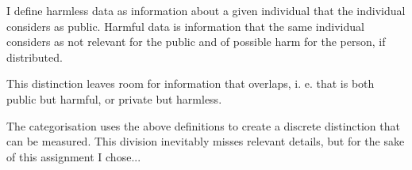 \documentclass{article}
\begin{document}
I define harmless data as information about a given individual that the 
individual considers as public.
Harmful data is information that the same individual considers as not 
relevant for the public and of possible harm for the person, if distributed.

This distinction leaves room for information that overlaps, i. e. that is
both public but harmful, or private but harmless.

The categorisation uses the above definitions to create a discrete 
distinction that can be measured. This division inevitably misses 
relevant details, but for the sake of this assignment I chose...
\end{document}
